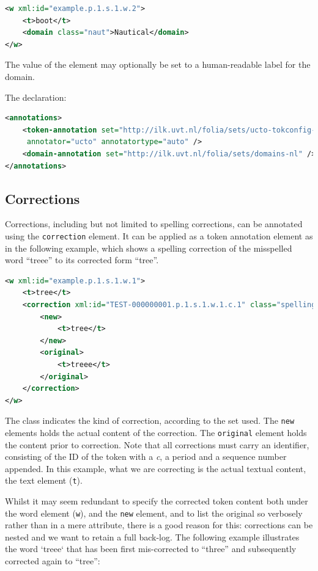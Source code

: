 \documentclass[a4paper,12pt]{report}
\begin{document}
\begin{lstlisting}[language=xml]
<w xml:id="example.p.1.s.1.w.2">
    <t>boot</t>
    <domain class="naut">Nautical</domain>
</w>
\end{lstlisting}

The value of the element may optionally be set to a human-readable label for the domain.

The declaration:

\begin{lstlisting}[language=xml]
<annotations>
    <token-annotation set="http://ilk.uvt.nl/folia/sets/ucto-tokconfig-nl"
     annotator="ucto" annotatortype="auto" />
    <domain-annotation set="http://ilk.uvt.nl/folia/sets/domains-nl" />
</annotations>
\end{lstlisting}

\subsection{Corrections}

Corrections, including but not limited to spelling corrections, can be annotated using the \texttt{correction} element. It can be applied as a token annotation element as in the following example, which shows a spelling correction of the misspelled word ``treee'' to its corrected form ``tree''.


\begin{lstlisting}[language=xml]
<w xml:id="example.p.1.s.1.w.1">
    <t>tree</t>
    <correction xml:id="TEST-000000001.p.1.s.1.w.1.c.1" class="spelling">
        <new>
            <t>tree</t>
        </new>
        <original>
            <t>treee</t>
        </original>
    </correction>
</w>
\end{lstlisting}

The class indicates the kind of correction, according to the set used. The \texttt{new} elements holds the actual content of the correction. The \texttt{original} element holds the content prior to correction. Note that all corrections must carry an identifier, consisting of the ID of the token with a \emph{c}, a period and a sequence number appended. In this example, what we are correcting is the actual textual content, the text element (\texttt{t}).

Whilst it may seem redundant to specify the corrected token content both under the word element (\texttt{w}), and the \texttt{new} element, and to list the original so verbosely rather than in a mere attribute, there is a good reason for this: corrections can be nested and we want to retain a full back-log. The following example illustrates the word `treee` that has been first mis-corrected to ``three'' and subsequently corrected again to ``tree'':
\end{document}
